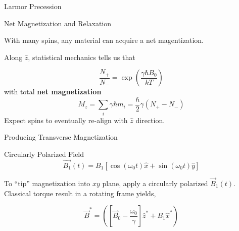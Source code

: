\documentclass[aspectratio=169,xcolor=dvipsnames]{beamer}
\newcommand{\Bnot}{\vec{B}_0}
\newcommand{\Bone}{\vec{B}_1}
\begin{document}
\begin{frame}{Larmor Precession}
\begin{minipage}{0.4\linewidth}
    \end{minipage}
    
\end{frame}

 

\begin{frame}{Net Magnetization and Relaxation}

    With many spins, any material can acquire a net magentization.

    Along $\hat{z}$, statistical mechanics tells us that 

    \begin{equation}
        \frac{N_+}{N_-} = \exp\left(\frac{\gamma \hbar B_0}{k T}\right)
    \end{equation}
    with total \textbf{net magnetization}
    \begin{equation}
        M_z = \sum_i \gamma \hbar m_i = \frac{\hbar}{2} \gamma (N_+ - N_-)
    \end{equation}
    Expect spins to eventually re-align with $\hat{z}$ direction. 
\end{frame}


\begin{frame}{Producing Transverse Magnetization}
    \begin{block}{Circularly Polarized Field}
        \begin{equation}
            \vec{B_1}(t) = B_1\left[\cos(\omega_0t)\hat{x}+\sin(\omega_0t)\hat{y}\right]
        \end{equation}        
    \end{block}
    To ``tip'' magnetization into $xy$ plane, apply a circularly polarized $\Bone (t)$. Classical torque result in a rotating frame yields, 

    
    \begin{equation}
        \vec{B}^* = \left(\left[\Bnot- \frac{\omega_0}{\gamma}\right] \hat{z}^* + B_1 \hat{x}^*\right)
    \end{equation}
\end{frame}
\end{document}
